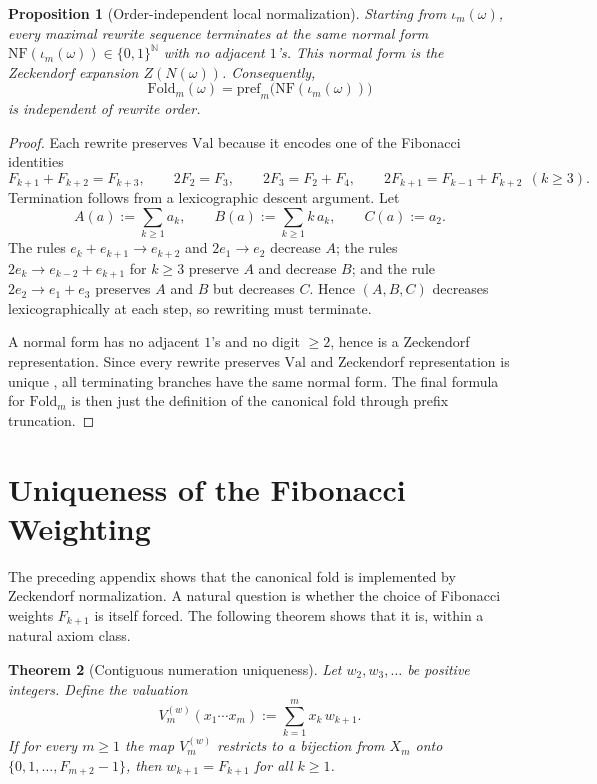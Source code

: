 \documentclass[11pt,letterpaper]{article}
\numberwithin{equation}{section}
\theoremstyle{plain}
\newtheorem{theorem}{Theorem}[section]
\newtheorem{proposition}[theorem]{Proposition}
\theoremstyle{definition}
\theoremstyle{remark}
\newcommand{\Fold}{\mathrm{Fold}}
\newcommand{\pref}{\mathrm{pref}}
\begin{document}
\begin{proposition}[Order-independent local normalization]\label{prop:canonical-fold-rewrite}
Starting from \(\iota_m(\omega)\), every maximal rewrite sequence terminates at
the same normal form \(\mathrm{NF}(\iota_m(\omega))\in\{0,1\}^{\mathbb{N}}\)
with no adjacent \(1\)'s. This normal form is the Zeckendorf expansion
\(Z(N(\omega))\). Consequently,
\[
\Fold_m(\omega)=\pref_m\bigl(\mathrm{NF}(\iota_m(\omega))\bigr)
\]
is independent of rewrite order.
\end{proposition}

\begin{proof}
Each rewrite preserves \(\mathrm{Val}\) because it encodes one of the Fibonacci
identities
\[
F_{k+1}+F_{k+2}=F_{k+3},
\qquad
2F_2=F_3,
\qquad
2F_3=F_2+F_4,
\qquad
2F_{k+1}=F_{k-1}+F_{k+2}\ \ (k\ge 3).
\]
Termination follows from a lexicographic descent argument. Let
\[
A(a):=\sum_{k\ge 1} a_k,
\qquad
B(a):=\sum_{k\ge 1} k\,a_k,
\qquad
C(a):=a_2.
\]
The rules \(e_k+e_{k+1}\to e_{k+2}\) and \(2e_1\to e_2\) decrease \(A\); the
rules \(2e_k\to e_{k-2}+e_{k+1}\) for \(k\ge 3\) preserve \(A\) and decrease
\(B\); and the rule \(2e_2\to e_1+e_3\) preserves \(A\) and \(B\) but decreases
\(C\). Hence \((A,B,C)\) decreases lexicographically at each step, so rewriting
must terminate.

A normal form has no adjacent \(1\)'s and no digit \(\ge 2\), hence is a
Zeckendorf representation. Since every rewrite preserves \(\mathrm{Val}\) and
Zeckendorf representation is unique \cite{Zeckendorf1972}, all terminating
branches have the same normal form. The final formula for \(\Fold_m\) is then
just the definition of the canonical fold through prefix truncation.
\end{proof}

\section{Uniqueness of the Fibonacci Weighting}\label{app:fibonacci-uniqueness}

The preceding appendix shows that the canonical fold is implemented by
Zeckendorf normalization. A natural question is whether the choice of
Fibonacci weights \(F_{k+1}\) is itself forced. The following theorem shows
that it is, within a natural axiom class.

\begin{theorem}[Contiguous numeration uniqueness]
\label{thm:fibonacci-weight-uniqueness}
Let \(w_2,w_3,\dots\) be positive integers. Define the valuation
\[
V_m^{(w)}(x_1\cdots x_m):=\sum_{k=1}^m x_k\,w_{k+1}.
\]
If for every \(m\ge 1\) the map \(V_m^{(w)}\) restricts to a bijection from
\(X_m\) onto \(\{0,1,\dots,F_{m+2}-1\}\), then \(w_{k+1}=F_{k+1}\) for all
\(k\ge 1\).
\end{theorem}
\end{document}

